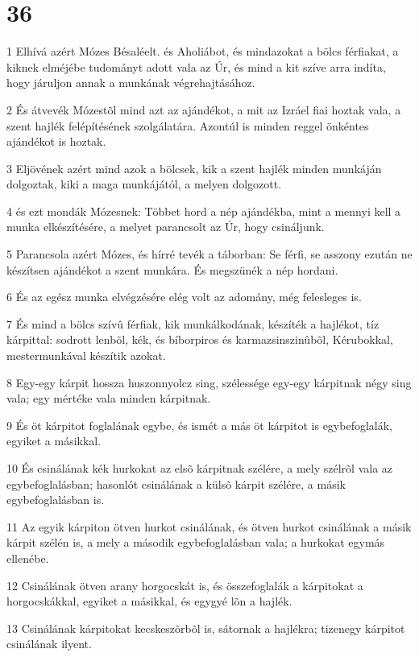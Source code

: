 \chapter{36}

\par 1 Elhívá azért Mózes Bésaléelt. és Aholiábot, és mindazokat a bölcs férfiakat, a kiknek elméjébe tudományt adott vala az Úr, és mind a kit szíve arra indíta, hogy járuljon annak a munkának végrehajtásához.
\par 2 És átvevék Mózestõl mind azt az ajándékot, a mit az Izráel fiai hoztak vala, a szent hajlék felépítésének szolgálatára. Azontúl is minden reggel önkéntes ajándékot is hoztak.
\par 3 Eljövének azért mind azok a bölcsek, kik a szent hajlék minden munkáján dolgoztak, kiki a maga munkájától, a melyen dolgozott.
\par 4 és ezt mondák Mózesnek: Többet hord a nép ajándékba, mint a mennyi kell a munka elkészítésére, a melyet parancsolt az Úr, hogy csináljunk.
\par 5 Parancsola azért Mózes, és hírré tevék a táborban: Se férfi, se asszony ezután ne készítsen ajándékot a szent munkára. És megszünék a nép hordani.
\par 6 És az egész munka elvégzésére elég volt az adomány, még felesleges is.
\par 7 És mind a bölcs szívû férfiak, kik munkálkodának, készíték a hajlékot, tíz kárpittal: sodrott lenbõl, kék, és bíborpiros és karmazsinszinûbõl, Kérubokkal, mestermunkával készítik azokat.
\par 8 Egy-egy kárpit hossza huszonnyolcz sing, szélessége egy-egy kárpitnak négy sing vala; egy mértéke vala minden kárpitnak.
\par 9 És öt kárpitot foglalának egybe, és ismét a más öt kárpitot is egybefoglalák, egyiket a másikkal.
\par 10 És csinálának kék hurkokat az elsõ kárpitnak szélére, a mely szélrõl vala az egybefoglalásban; hasonlót csinálának a külsõ kárpit szélére, a másik egybefoglalásban is.
\par 11 Az egyik kárpiton ötven hurkot csinálának, és ötven hurkot csinálának a másik kárpit szélén is, a mely a második egybefoglalásban vala; a hurkokat egymás ellenébe.
\par 12 Csinálának ötven arany horgocskát is, és összefoglalák a kárpitokat a horgocskákkal, egyiket a másikkal, és egygyé lõn a hajlék.
\par 13 Csinálának kárpitokat kecskeszõrbõl is, sátornak a hajlékra; tizenegy kárpitot csinálának ilyent.
